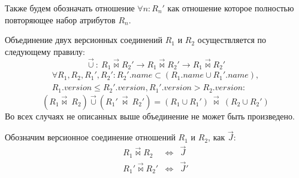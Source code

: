 \indent Также будем обозначать отношение $\forall n : R_n'$ как отношение которое полностью повторяющее набор атрибутов $R_n$.

\begin{definition}
	\label{def:union}
	Объединение двух версионных соединений $R_1$ и $R_2$ осуществляется по следующему правилу:
	\begin{equation*}
		\overrightarrow{\cup} :\ R_1\overrightarrow{\bowtie}R_2' \rightarrow R_1\overrightarrow{\bowtie}R_2' \rightarrow R_1\overrightarrow{\bowtie}R_2'
	\end{equation*}
	\begin{multline*}
		\forall R_1,R_2,R_1',R_2': R_2'.name \subset (R_1.name \cup R_1'.name),\\
		R_1.version \leq R_2'.version, R_1'.version > R_2.version:
	\end{multline*}
	\begin{equation}
		(R_1\overrightarrow{\bowtie}\ R_2) \overrightarrow{\cup} (R_1'\ \overrightarrow{\bowtie}\ R_2') = (R_1 \cup R_1')\ \overrightarrow{\bowtie}\ (R_2 \cup R_2')
	\end{equation}
	Во всех случаях не описанных выше объединение не может быть произведено.
\end{definition}

\indent Обозначим версионное соединение отношений $R_1$ и $R_2$, как $\overrightarrow{J}$:
\begin{eqnarray*}
	R_1 \overrightarrow{\bowtie} R_2 & \Leftrightarrow & \overrightarrow{J} \\
	R_1' \overrightarrow{\bowtie} R_2' & \Leftrightarrow & \overrightarrow{J}'
\end{eqnarray*}

